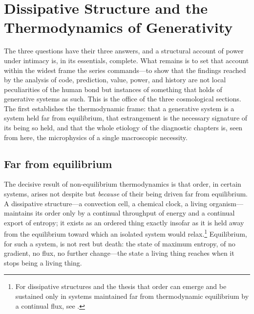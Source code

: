 \section{Dissipative Structure and the Thermodynamics of Generativity}
\label{p17:sec:dissipation}

\noindent
The three questions have their three answers, and a structural account of power under intimacy is, in its essentials, complete. What remains is to set that account within the widest frame the series commands---to show that the findings reached by the analysis of code, prediction, value, power, and history are not local peculiarities of the human bond but instances of something that holds of generative systems as such. This is the office of the three cosmological sections. The first establishes the thermodynamic frame: that a generative system is a system held far from equilibrium, that estrangement is the necessary signature of its being so held, and that the whole etiology of the diagnostic chapters is, seen from here, the microphysics of a single macroscopic necessity.

\subsection{Far from equilibrium}
\label{p17:sub:dissipation-far}

The decisive result of non-equilibrium thermodynamics is that order, in certain systems, arises not despite but \emph{because} of their being driven far from equilibrium. A dissipative structure---a convection cell, a chemical clock, a living organism---maintains its order only by a continual throughput of energy and a continual export of entropy; it exists as an ordered thing exactly insofar as it is held away from the equilibrium toward which an isolated system would relax.\footnote{For dissipative structures and the thesis that order can emerge and be sustained only in systems maintained far from thermodynamic equilibrium by a continual flux, see \textcite{prigogine1984}.} Equilibrium, for such a system, is not rest but death: the state of maximum entropy, of no gradient, no flux, no further change---the state a living thing reaches when it stops being a living thing.

